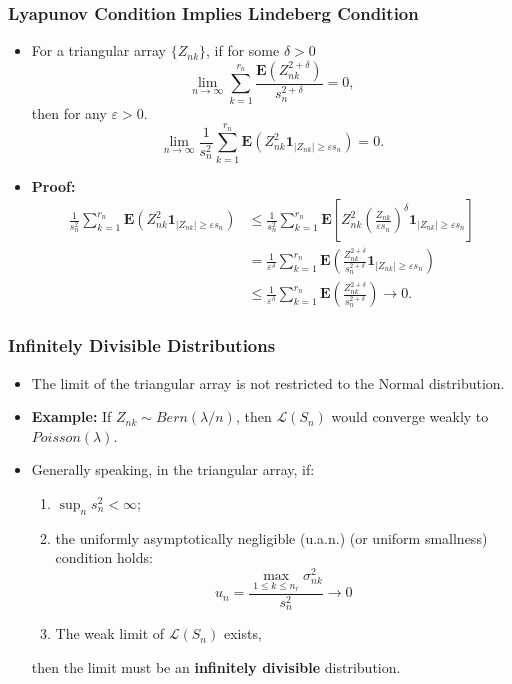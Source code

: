 \documentclass[handout]{beamer}
\newcommand{\BE}{\mathbf{E}}
\newcommand{\BI}{\mathbf{1}}
\begin{document}
     \frame
{
  \frametitle{Lyapunov Condition Implies Lindeberg Condition}
   \begin{itemize}


\item<1-> For a triangular array $\{Z_{nk}\}$, if for some $\delta>0$
$$\lim_{n\rightarrow \infty} \sum_{k=1}^{r_n} \frac{ \BE(Z_{nk}^{2+\delta})}{s_n^{2+\delta}}=0,$$
then for any $\varepsilon>0$.
$$\lim_{n\rightarrow \infty} \frac{1}{s_n^2} \sum_{k=1}^{r_n} \BE(Z_{nk}^2 \BI_{|Z_{nk}|\geq \varepsilon s_n})=0.$$

\item<2->\textbf{Proof:} \begin{align*}
\frac{1}{s_n^2} \sum_{k=1}^{r_n} \BE(Z_{nk}^2 \BI_{|Z_{nk}|\geq \varepsilon s_n})& \leq \frac{1}{s_n^2} \sum_{k=1}^{r_n} \BE[Z_{nk}^2 (\frac{Z_{nk}}{\varepsilon s_n} )^{\delta} \BI_{|Z_{nk}|\geq \varepsilon s_n}] \\
&= \frac{1}{\varepsilon^{\delta}} \sum_{k=1}^{r_n} \BE( \frac{Z_{nk}^{2+\delta}}{s_n^{2+\delta}}  \BI_{|Z_{nk}|\geq \varepsilon s_n})  \\
&\leq \frac{1}{\varepsilon^{\delta}} \sum_{k=1}^{r_n} \BE( \frac{Z_{nk}^{2+\delta}}{s_n^{2+\delta}})   \rightarrow 0.
\end{align*}

\end{itemize}
}


\frame
{
\frametitle{Infinitely Divisible Distributions}
\begin{itemize}

\item<1-> The limit  of the triangular array is not restricted to the Normal distribution. 

\item<2-> \textbf{Example:} If $Z_{nk}\sim Bern(\lambda/n)$, then $\mathcal{L} (S_n)$ would converge weakly to $Poisson(\lambda)$.

\item<3-> Generally speaking, in the triangular array, if: 
\begin{enumerate}
\item $\sup_n s_n^2<\infty$; 
\item the uniformly asymptotically negligible (u.a.n.) (or uniform smallness) condition holds:
$$
u_n = \frac{\max_{1\leq k\leq n_r} \sigma_{nk}^2}{s_n^2} \rightarrow 0
$$ 
\item The weak limit of  $\mathcal{L} (S_n)$ exists,  
\end{enumerate}
then the limit must be an  \textbf{infinitely divisible} distribution. 

\end{itemize}
}
 
\end{document}
